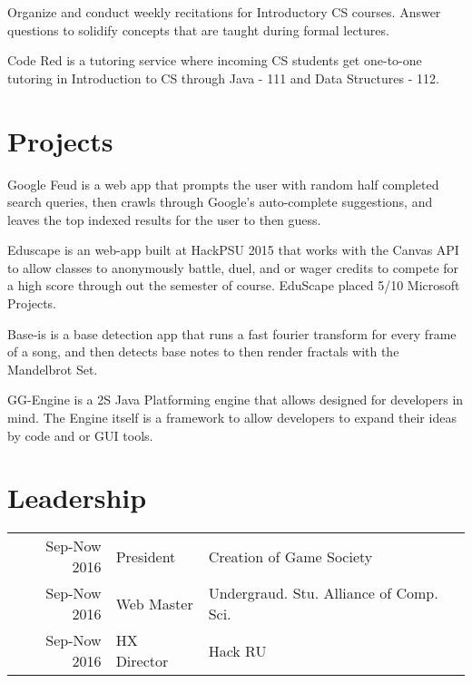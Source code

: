 \documentclass[]{deedy-resume-openfont}
\begin{document}
\begin{minipage}[t]{0.66\textwidth}
\begin{tightemize}
\item Organize and conduct weekly recitations for Introductory CS courses. Answer questions to solidify concepts that are taught during formal lectures. 
\item Code Red is a tutoring service where incoming CS students get one-to-one tutoring in Introduction to CS through Java - 111 and Data Structures - 112. 
\end{tightemize}
\sectionsep

\section{Projects}
Google Feud is a web app that prompts the user with random half completed search queries, then crawls through Google's auto-complete suggestions, and leaves the top indexed results for the user to then guess. 
\sectionsep

Eduscape is an web-app built at HackPSU 2015 that works with the Canvas API to allow classes to anonymously battle, duel, and or wager credits to compete for a high score through out the semester of course. EduScape placed 5/10 Microsoft Projects.  
\sectionsep

Base-is is a base detection app that runs a fast fourier transform for every frame of a song, and then detects base notes to then render fractals with the Mandelbrot Set. 
\sectionsep

GG-Engine is a 2S Java Platforming engine that allows designed for developers in mind. The Engine itself is a framework to allow developers to expand their ideas by code and or GUI tools.
\sectionsep




\section{Leadership} 
\begin{tabular}{rll}
Sep-Now 2016 & President  & Creation of Game Society\\
Sep-Now 2016 & Web Master & Undergraud. Stu. Alliance of Comp. Sci. \\
Sep-Now 2016 & HX Director  & Hack RU \\ 


\end{tabular}
\sectionsep

\end{minipage} 
\end{document}
